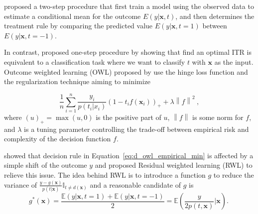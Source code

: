 \documentclass{article}
\begin{document}
\cite{Qian2011-vz} proposed a two-step procedure that first train a
model using the observed data to estimate
a conditional mean for the outcome $E(y|\mathbf{x},t)$, and then determines the treatment
rule by comparing the predicted value $E(y|\mathbf{x},t=1)$ between $E(y|\mathbf{x},t=-1)$.

In contrast, \cite{zhao2012estimating} proposed one-step procedure by
showing that find an optimal ITR is equivalent to a classification task
where we want to classify $t$ with $\mathbf{x}$ as the input. Outcome weighted learning (OWL) proposed by
\cite{zhao2012estimating} use the hinge loss function and the
regularization technique aiming to minimize

\begin{equation}
  \frac{1}{n}\sum_{i=1}^{n}\frac{y_i}{p(t_i|x_i)}(1-t_if(\mathbf{x}_i))_{+}+\lambda\left
    \| f \right \|^2 ~\label{eq:d_owl_empirical_min},
\end{equation}
where $(u)_+=\max(u,0)$ is the positive part of $u$, $\left \| f
\right \|$ is some norm for $f$, and $\lambda$ is a tuning parameter
controlling the trade-off between empirical risk and complexity of the
decision function $f$.

\cite{Zhou_undated-ps} showed that decision rule in
Equation~\ref{eq:d_owl_empirical_min} is
affected by a simple shift of the outcome $y$ and proposed Residual
weighted learning (RWL) to relieve this issue. The idea behind RWL is
to introduce a function $g$ to reduce the variance of
$\frac{y-g(\mathbf{x})}{p(t|\mathbf{x})}\mathbb{I}_{t \neq
  d(\mathbf{x})}$ and a reasonable candidate of $g$ is
\begin{equation}
  g^{*}(\mathbf{x}) = \frac{\mathbb{E}(y|\mathbf{x},
    t=1)+\mathbb{E}(y|\mathbf{x}, t=-1)}{2} = \mathbb{E} \left (
    \frac{y}{2p(t, \mathbf{x})} | \mathbf{x} \right ).~\label{eq:g-choice}
\end{equation}
\end{document}
